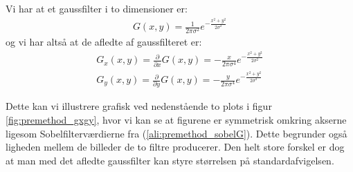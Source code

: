 Vi har at et gaussfilter i to dimensioner er:
\begin{align}
	G(x,y) = \frac{1}{2\pi\sigma^2}e^{-\frac{x^2+y^2}{2\sigma^2}}
\end{align}
og vi har altså at de afledte af gaussfilteret er:
\begin{align}
	G_x(x,y) = \frac{\partial}{\partial x}G(x,y)=-\frac{x}{2\pi\sigma^4}e^{-\frac{x^2+y^2}{2\sigma^2}} \label{ali:premethod_gauss}\\
	G_y(x,y) = \frac{\partial}{\partial y}G(x,y)=-\frac{y}{2\pi\sigma^4}e^{-\frac{x^2+y^2}{2\sigma^2}}
\end{align}

Dette kan vi illustrere grafisk ved nedenstående to plots i figur \ref{fig:premethod_gxgy}, hvor vi kan se at figurene er symmetrisk omkring akserne ligesom Sobelfilterværdierne fra (\ref{ali:premethod_sobelG}). Dette begrunder også ligheden mellem de billeder de to filtre producerer. Den helt store forskel er dog at man med det afledte gaussfilter kan styre størrelsen på standardafvigelsen. 

